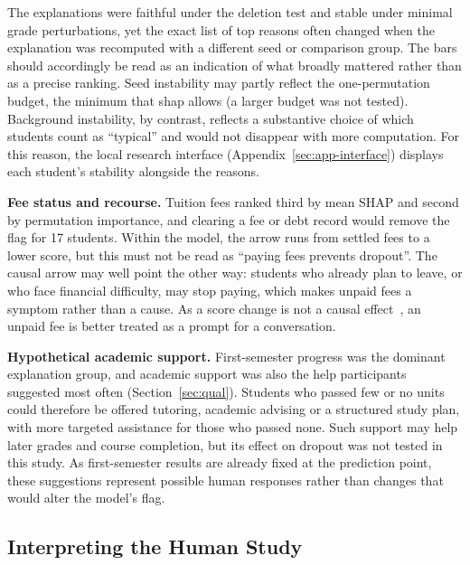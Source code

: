 The explanations were faithful under the deletion test and stable under minimal grade
perturbations, yet the exact list of top reasons often changed when the explanation was recomputed
with a different seed or comparison group. The bars should accordingly be read as an indication of
what broadly mattered rather than as a precise ranking. Seed instability may partly reflect the
one-permutation budget, the minimum that shap allows (a larger budget was not tested). Background
instability, by contrast, reflects a substantive choice of which students count as ``typical'' and
would not disappear with more computation. For this reason, the local research interface
(Appendix~\ref{sec:app-interface}) displays each student's stability alongside the reasons.

\textbf{Fee status and recourse.} Tuition fees ranked third by mean SHAP and second by permutation
importance, and clearing a
fee or debt record would remove the flag for 17 students. Within the model, the arrow runs from
settled fees to a lower score, but this must not be read as ``paying fees prevents dropout''. The
causal arrow may well point the other way: students who already plan to leave, or who face financial
difficulty, may stop paying, which makes unpaid fees a symptom rather than a cause. As a score change
is not a causal effect~\citep{karimi2021recourse}, an unpaid fee is better treated as a prompt for a
conversation.

\textbf{Hypothetical academic support.} First-semester progress was the dominant explanation group,
and academic support was also the help participants suggested most often (Section~\ref{sec:qual}).
Students who passed few or no units could therefore be offered tutoring, academic advising or a
structured study plan, with more targeted assistance for those who passed none. Such support may help
later grades and course completion, but its effect on dropout was not tested in this study. As
first-semester results are already fixed at the prediction point, these suggestions represent
possible human responses rather than changes that would alter the model's flag.

\subsection{Interpreting the Human Study}

